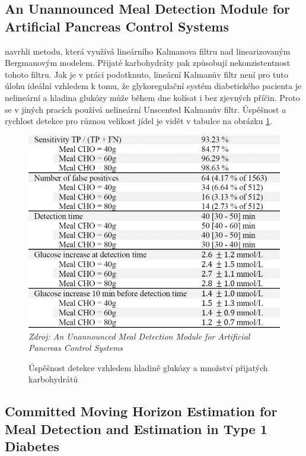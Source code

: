\subsection{An Unannounced Meal Detection Module for Artificial Pancreas Control Systems}
\label{ch:analyzaCHO:nekonzistence}

\citet{analyzaCHO.Nekonzistence} navrhli metodu, která využívá lineárního Kalmanova filtru nad linearizovaným Bergmanovým modelem. Přijaté karbohydráty pak způsobují nekonzistentnost tohoto filtru. Jak je v práci podotknuto, lineární Kalmanův filtr není pro tuto úlohu ideální vzhledem k tomu, že glykoregulační systém diabetického pacienta je nelineární a hladina glukózy může během dne kolísat i bez zjevných příčin. Proto se v jiných pracích používá nelineární Unscented Kalmanův filtr. Úspěšnost a rychlost detekce pro různou velikost jídel je vidět v tabulce na obrázku \ref{fig:analyza:nekonzistence}.

\begin{figure}[H]
\caption{Úspěšnost detekce vzhledem hladině glukózy a množství přijatých karbohydrátů}
\label{fig:analyza:nekonzistence}
\includegraphics[width=1\textwidth]{img/analyzaCHO/nekonzistence.png}\\
\textit{Zdroj: An Unannounced Meal Detection Module for Artificial Pancreas Control Systems \citep{analyzaCHO.Nekonzistence}}
\end{figure}


\subsection{Committed Moving Horizon Estimation for Meal Detection and Estimation in Type 1 Diabetes}
\label{ch:analyzaCHO:horizon}

